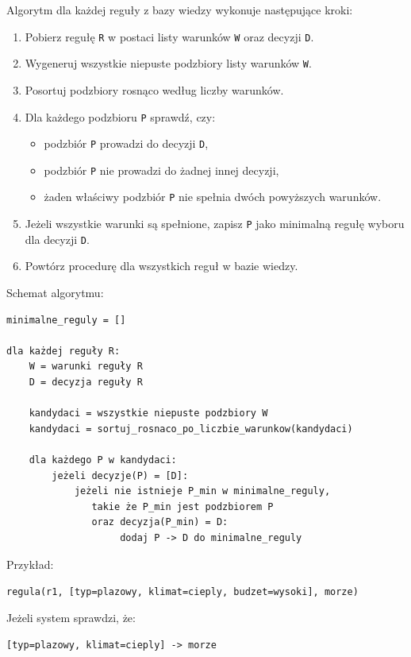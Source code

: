 \documentclass[12pt,a4paper]{article}
\begin{document}
Algorytm dla każdej reguły z bazy wiedzy wykonuje następujące kroki:

\begin{enumerate}
    \item Pobierz regułę \texttt{R} w postaci listy warunków \texttt{W} oraz decyzji \texttt{D}.
    \item Wygeneruj wszystkie niepuste podzbiory listy warunków \texttt{W}.
    \item Posortuj podzbiory rosnąco według liczby warunków.
    \item Dla każdego podzbioru \texttt{P} sprawdź, czy:
    \begin{itemize}
        \item podzbiór \texttt{P} prowadzi do decyzji \texttt{D},
        \item podzbiór \texttt{P} nie prowadzi do żadnej innej decyzji,
        \item żaden właściwy podzbiór \texttt{P} nie spełnia dwóch powyższych warunków.
    \end{itemize}
    \item Jeżeli wszystkie warunki są spełnione, zapisz \texttt{P} jako minimalną regułę wyboru dla decyzji \texttt{D}.
    \item Powtórz procedurę dla wszystkich reguł w bazie wiedzy.
\end{enumerate}

\newpage
Schemat algorytmu:

\begin{verbatim}
minimalne_reguly = []

dla każdej reguły R:
    W = warunki reguły R
    D = decyzja reguły R

    kandydaci = wszystkie niepuste podzbiory W
    kandydaci = sortuj_rosnaco_po_liczbie_warunkow(kandydaci)

    dla każdego P w kandydaci:
        jeżeli decyzje(P) = [D]:
            jeżeli nie istnieje P_min w minimalne_reguly,
               takie że P_min jest podzbiorem P
               oraz decyzja(P_min) = D:
                    dodaj P -> D do minimalne_reguly
\end{verbatim}

Przykład:

\begin{center}
\texttt{regula(r1, [typ=plazowy, klimat=cieply, budzet=wysoki], morze)}
\end{center}

Jeżeli system sprawdzi, że:

\begin{center}
\texttt{[typ=plazowy, klimat=cieply] -> morze}
\end{center}
\end{document}
